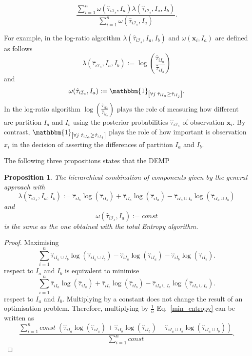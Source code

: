 \documentclass[10pt, a4paper]{article}
\newtheorem{prop}{Proposition}
\newcommand{\m}[1]{\boldsymbol{#1}}
\begin{document}
\begin{equation}
\frac{\sum_{i=1}^n \omega(\hat{\tau}_{i \mathcal{I}_s}, I_a) \lambda(\hat{\tau}_{i \mathcal{I}_s}, I_a, I_b)}{\sum_{i=1}^n \omega(\hat{\tau}_{i \mathcal{I}_s}, I_a) }.
\end{equation}

For example, in the log-ratio algorithm $\lambda(\hat{\tau}_{i \mathcal{I}_s}, I_a, I_b)$ and $\omega(\m x_i, I_a)$ are defined as follows
\[
\lambda(\hat{\tau}_{i \mathcal{I}_s}, I_a, I_b) := \log( \frac{ \hat{\tau}_{iI_a} }{ \hat{\tau}_{iI_b} })
\]
and
\[
\omega(\hat{\tau}_{i \mathcal{I}_s}, I_a) := \mathbbm{1}_{\left[ \forall j\; \hat{\tau}_{i I_{a}} \geq \hat{\tau}_{iI_j} \right]}.
\]
In the log-ratio algorithm $\log( \frac{ \hat{\tau}_{iI_a} }{ \hat{\tau}_{iI_b} })$ plays the role of measuring how different are partition $I_a$ and $I_b$ using the posterior probabilities $\hat{\tau}_{i \mathcal{I}_s}$ of observation $\m x_i$. By contrast, $\mathbbm{1}_{\left[ \forall j\; \hat{\tau}_{i I_{a}} \geq \hat{\tau}_{iI_j} \right]}$ plays the role of how important is observation $x_i$ in the decision of asserting the differences of partition $I_a$ and $I_b$.

The following three propositions states that the DEMP


\begin{prop}
The hierarchical combination of components given by the general approach with
\[
\lambda(\hat{\tau}_{i \mathcal{I}_s}, I_a, I_b) := \hat{\tau}_{iI_b} \log(\hat{\tau}_{iI_b}) + \hat{\tau}_{iI_a} \log(\hat{\tau}_{iI_a}) - \hat{\tau}_{i I_a \cup I_b} \log(\hat{\tau}_{i I_a \cup I_b})
\]
and
\[
\omega(\hat{\tau}_{i \mathcal{I}_s}, I_a) := const
\]
is the same as the one obtained with the total Entropy algorithm.
\end{prop}
\begin{proof}
Maximising
\[
\sum_{i=1}^n \hat{\tau}_{i I_a \cup I_b} \log(\hat{\tau}_{i I_a \cup I_b}) - \hat{\tau}_{iI_a} \log(\hat{\tau}_{iI_a}) - \hat{\tau}_{iI_b} \log(\hat{\tau}_{iI_b}).
\]
respect to $I_a$ and $I_b$ is equivalent to minimise
\begin{equation}\label{min_entropy}
\sum_{i=1}^n \hat{\tau}_{iI_a} \log(\hat{\tau}_{iI_a}) + \hat{\tau}_{iI_b} \log(\hat{\tau}_{iI_b}) - \hat{\tau}_{i I_a \cup I_b} \log(\hat{\tau}_{i I_a \cup I_b}).
\end{equation}
respect to $I_a$ and $I_b$. Multiplying by a constant does not change the result of an optimisation problem. Therefore, multiplying by $\frac{1}{n}$ Eq.~\ref{min_entropy} can be written as
\[
\frac{\sum_{i=1}^n const \; ( \hat{\tau}_{iI_a} \log(\hat{\tau}_{iI_a}) + \hat{\tau}_{iI_b} \log(\hat{\tau}_{iI_b}) - \hat{\tau}_{i I_a \cup I_b} \log(\hat{\tau}_{i I_a \cup I_b}) )}{\sum_{i=1}^n const}.
\]
\end{proof}
\end{document}
